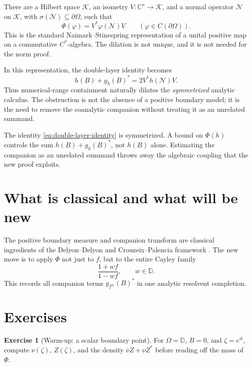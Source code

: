 \documentclass[11pt,oneside,openany]{book}
\theoremstyle{definition}
\newtheorem{exercise}{Exercise}[chapter]
\theoremstyle{remark}
\newcommand{\C}{\mathbb C}
\newcommand{\D}{\mathbb D}
\newcommand{\spec}{\sigma}
\begin{document}
\begin{blackbox}
There are a Hilbert space \(\mathcal K\), an isometry
\(V:\C^n\to\mathcal K\), and a normal operator \(\mathcal N\) on
\(\mathcal K\), with
\(\spec(\mathcal N)\subseteq\partial\Omega\), such that
\[
  \Phi(\varphi)=V^*\varphi(\mathcal N)V
  \qquad
  (\varphi\in C(\partial\Omega)).
\]
This is the standard Naimark--Stinespring representation of a unital
positive map on a commutative \(C^*\)-algebra.  The dilation is not
unique, and it is not needed for the norm proof.
\end{blackbox}

In this representation, the double-layer identity becomes
\begin{equation}
  h(B)+g_h(B)^*
  =
  2V^*h(\mathcal N)V.
  \label{eq:symmetrized-normal-dilation}
\end{equation}
Thus numerical-range containment naturally dilates the
\emph{symmetrized} analytic calculus.  The obstruction is not the
absence of a positive boundary model; it is the need to remove the
coanalytic companion without treating it as an unrelated summand.

\begin{pitfall}
The identity \eqref{eq:double-layer-identity} is symmetrized.  A bound
on \(\Phi(h)\) controls the sum \(h(B)+g_h(B)^*\), not \(h(B)\) alone.
Estimating the companion as an unrelated summand throws away the
algebraic coupling that the new proof exploits.
\end{pitfall}

\section{What is classical and what will be new}

The positive boundary measure and companion transform are classical
ingredients of the Delyon--Delyon and Crouzeix--Palencia framework
\cite{DelyonDelyon1999,CrouzeixPalencia2017}.  The new move is to
apply \(\Phi\) not just to \(f\), but to the entire Cayley family
\[
  \frac{1+wf}{1-wf},
  \qquad w\in\D.
\]
This records all companion terms \(g_{f^m}(B)^*\) in one analytic
resolvent completion.

\section{Exercises}

\begin{exercise}[Warm-up: a scalar boundary point]
For \(\Omega=\D\), \(B=0\), and \(\zeta=e^{it}\), compute
\(\nu(\zeta)\), \(Z(\zeta)\), and the density
\(\overline\nu Z+\nu Z^*\) before reading off the mass of \(\Phi\).
\end{exercise}
\end{document}
